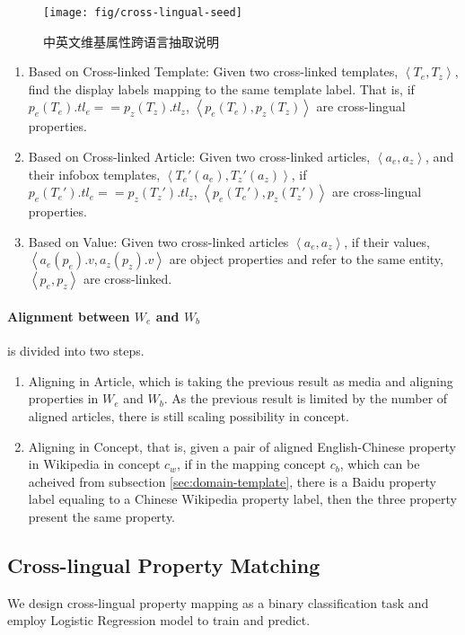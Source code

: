 \documentclass[runningheads,a4paper]{llncs}
\begin{document}
\begin{figure}[h]
  \centering
    \texttt{[image: fig/cross-lingual-seed]}
  \caption{中英文维基属性跨语言抽取说明}
  \label{fig:cross-lingual-seed}
\end{figure}

\begin{enumerate}[1)]
    \item Based on Cross-linked Template: Given two cross-linked templates, $\left<T_e, T_z\right>$, find the display labels mapping to the same template label. That is, if $p_e(T_e).tl_e == p_z(T_z).tl_z$, $\left<p_e(T_e), p_z(T_z)\right>$ are cross-lingual properties.
    \item Based on Cross-linked Article: Given two cross-linked articles, $\left<a_e, a_z\right>$, and their infobox templates, $\left<T_e'(a_e), T_z'(a_z)\right>$, if $p_e(T_e').tl_e == p_z(T_z').tl_z$, $\left<p_e(T_e'), p_z(T_z')\right>$ are cross-lingual properties.
    \item Based on Value: Given two cross-linked articles $\left<a_e, a_z\right>$, if their values, $\left<a_e(p_e).v, a_z(p_z).v\right>$ are object properties and refer to the same entity, $\left<p_e, p_z\right>$ are cross-linked.
\end{enumerate}

\paragraph{ Alignment between $W_e$ and $W_b$} is divided into two steps.
\begin{enumerate}[1)]
\item Aligning in Article, which is taking the previous result as media and aligning properties in $W_e$ and $W_b$. As the previous result is limited by the number of aligned articles, there is still scaling possibility in concept.
\item Aligning in Concept, that is, given a pair of aligned English-Chinese property in Wikipedia in concept $c_w$, if in the mapping concept $c_b$, which can be acheived from subsection \ref{sec:domain-template}, there is a Baidu property label equaling to a Chinese Wikipedia property label, then the three property present the same property.
\end{enumerate}

\subsection{Cross-lingual Property Matching}
We design cross-lingual property mapping as a binary classification task and employ Logistic Regression model to train and predict.
\end{document}
